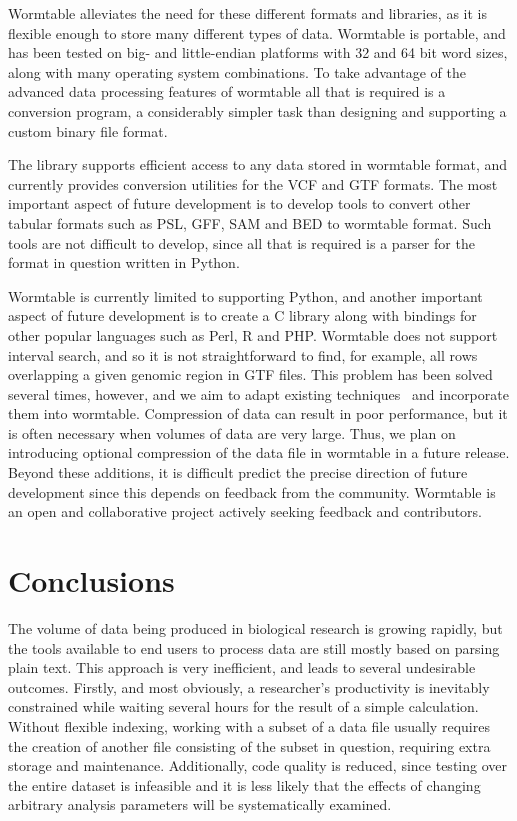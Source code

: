 \documentclass[10pt]{bmc_article}
\newenvironment{bmcformat}{\begin{raggedright}\baselineskip20pt\sloppy\setboolean{publ}{false}}{\end{raggedright}\baselineskip20pt\sloppy}
\begin{document}
\begin{bmcformat}
Wormtable alleviates the need for these different formats and libraries,
as it is flexible enough to store many different types of data. 
Wormtable is portable,
and has been tested on big- and little-endian platforms with 32 and 64
bit word sizes, along with many operating system combinations. To 
take advantage of the advanced data processing features of wormtable
all that is required is a conversion program, a considerably simpler
task than designing and supporting a custom binary file format.

The library supports efficient access to any data stored in 
wormtable format, and currently provides conversion utilities 
for the VCF and GTF formats.
The most important aspect of future development 
is to develop tools to convert other tabular formats such as 
PSL, GFF, SAM and BED to wormtable format. 
Such tools are not difficult to develop, since all that is required is a parser
for the format in question written in Python.

Wormtable is currently limited to supporting Python, and 
another important aspect of future development is to 
create a C library along with bindings for other popular
languages such as Perl, R and PHP. 
Wormtable does not support interval search, and so it is not
straightforward to find, for example, all rows overlapping 
a given genomic region in GTF files. 
This problem has been 
solved several times, however, and we aim to adapt existing 
techniques~\cite{li11,kzbhk10} and incorporate them into 
wormtable.  Compression of data can
result in poor performance, but it is often necessary when 
volumes of data are very large. Thus, we plan on introducing 
optional compression of the data file in wormtable in 
a future release. Beyond these additions, it is difficult
predict the precise direction of future development since this depends 
on feedback from the community.  Wormtable is an open and 
collaborative project actively seeking feedback and 
contributors.


\section*{Conclusions}
%
The volume of data being produced in biological research is growing 
rapidly, but the tools available to end users to 
process data are still mostly based on parsing plain text. This 
approach is very inefficient, and leads to several undesirable outcomes.
Firstly, and most obviously, a researcher's productivity is inevitably
constrained while waiting several hours for the result of a 
simple calculation. Without flexible indexing, working with 
a subset of a data file usually requires the creation of 
another file consisting of the subset in question, requiring 
extra storage and maintenance.
Additionally, code quality is reduced, since testing over 
the entire dataset is 
infeasible and it is less likely that the effects of 
changing arbitrary analysis parameters will be 
systematically examined.


\end{bmcformat}
\end{document}
